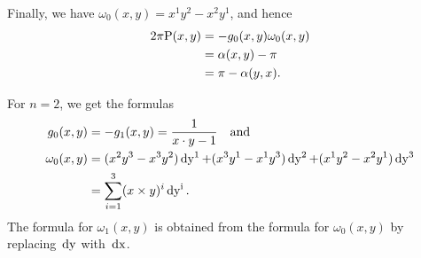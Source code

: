 \documentclass[\MainFolder/Text.tex]{subfiles}
\begin{document}
\begin{Example}
\begin{ExampleList}
Finally, we have $\omega_{0}(x,y) = x^1 y^2 - x^2 y^1$, and hence
\begin{align*}
2\pi \mathrm{P}(x,y) &=  - g_{0}(x,y) \omega_{0}(x,y) \\
& = \alpha(x,y) - \pi \\
& = \pi - \alpha(y,x).
\end{align*}
\item For $n=2$, we get the formulas
\allowdisplaybreaks
\begin{align*}
g_0(x,y) & = - g_1(x,y) = \frac{1}{x\cdot y - 1}\quad\text{and} \\
\omega_0(x,y) &=(x^2 y^3 - x^3 y^2) \operatorname{dy^1} +(x^3 y^1 - x^1 y^3) \operatorname{dy^2} + (x^1 y^2 - x^2 y^1) \operatorname{dy^3} \\ &=\sum_{i=1}^3 (x\times y)^i \operatorname{dy^i}.
\end{align*}
The formula for $\omega_1(x,y)$ is obtained from the formula for $\omega_0(x,y)$ by replacing~$\operatorname{dy}$ with~$\operatorname{dx}$.\qedhere
\end{ExampleList}
\end{Example}
\end{document}
